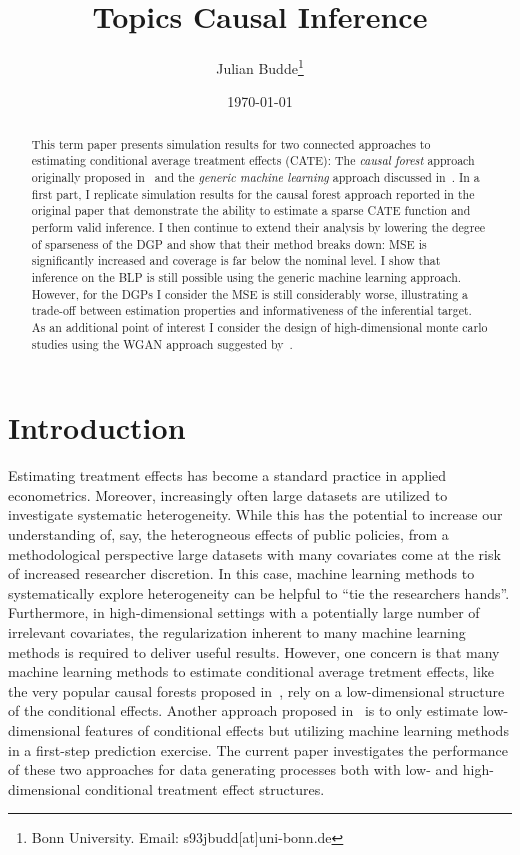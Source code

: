 \documentclass[11pt, a4paper, leqno]{article}
\title{Topics Causal Inference}
\author{Julian Budde\thanks{Bonn University. Email: s93jbudd[at]uni-bonn.de}}
\date{
    \today
}
\begin{document}
\maketitle

\begin{abstract}
    This term paper presents simulation results for two connected approaches to estimating conditional average treatment effects (CATE):
    The \textit{causal forest} approach originally proposed in~\citet{wager2018estimation} and the \textit{generic machine learning} approach discussed in~\citet{chernozhukov2023genml}.
    In a first part, I replicate simulation results for the causal forest approach reported in the original paper that demonstrate the ability to estimate a sparse CATE function and perform valid inference.
    I then continue to extend their analysis by lowering the degree of sparseness of the DGP and show that their method breaks down: MSE is significantly increased and coverage is far below the nominal level.
    I show that inference on the BLP is still possible using the generic machine learning approach. However, for the DGPs I consider the MSE is still considerably worse, illustrating a trade-off between estimation properties and informativeness of the inferential target.
    As an additional point of interest I consider the design of high-dimensional monte carlo studies using the WGAN approach suggested by~\citet{athey2024wgan}.
\end{abstract}

\clearpage

\section{Introduction}
Estimating treatment effects has become a standard practice in applied econometrics.
Moreover, increasingly often large datasets are utilized to investigate systematic heterogeneity.
While this has the potential to increase our understanding of, say, the heterogneous effects of public policies,
from a methodological perspective large datasets with many covariates come at the risk of increased researcher discretion.
In this case, machine learning methods to systematically explore heterogeneity can be helpful to ``tie the researchers hands''.
Furthermore, in high-dimensional settings with a potentially large number of irrelevant covariates, the regularization inherent to many machine learning methods is required to deliver useful results.
However, one concern is that many machine learning methods to estimate conditional average tretment effects, like the very popular causal forests proposed in~\citet{wager2018estimation}, rely on a low-dimensional structure of the conditional effects.
Another approach proposed in~\citet{chernozhukov2023genml} is to only estimate low-dimensional features of conditional effects but utilizing machine learning methods in a first-step prediction exercise.
The current paper investigates the performance of these two approaches for data generating processes both with low- and high-dimensional conditional treatment effect structures.
\end{document}
